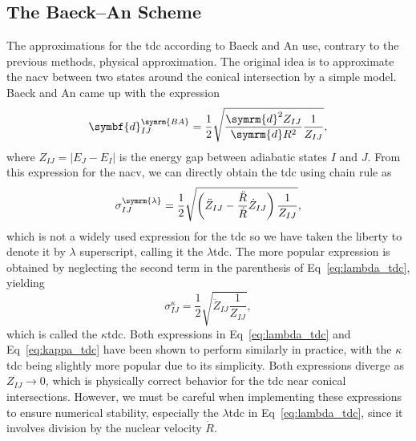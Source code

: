 \subsection{The Baeck--An Scheme}\label{sec:baeck_an}
The approximations for the \acrshort{tdc} according to Baeck and An use, contrary to the previous methods, physical approximation. The original idea is to approximate the \acrshort{nacv} between two states around the conical intersection by a simple model. Baeck and An came up with the expression\supercite{10.1063/1.4975323}
\begin{equation}\label{eq:baeck_an_nacv}
\symbf{d}_{IJ}^{\symrm{BA}}=\frac{1}{2}\sqrt{\frac{\symrm{d}^2Z_{IJ}}{\symrm{d}R^2}\frac{1}{Z_{IJ}}},
\end{equation}
where $Z_{IJ}=\lvert E_J-E_I\rvert$ is the energy gap between adiabatic states $I$ and $J$. From this expression for the \acrshort{nacv}, we can directly obtain the \acrshort{tdc} using chain rule as
\begin{equation}\label{eq:lambda_tdc}
\sigma_{IJ}^{\symrm{\lambda}}=\frac{1}{2}\sqrt{\left(\ddot Z_{IJ}-\frac{\ddot R}{\dot R}\dot Z_{IJ}\right)\frac{1}{Z_{IJ}}},
\end{equation}
which is not a widely used expression for the \acrshort{tdc} so we have taken the liberty to denote it by $\lambda$ superscript, calling it the $\lambda$\acrshort{tdc}.\supercite{10.1021/acs.jctc.5c01176} The more popular expression is obtained by neglecting the second term in the parenthesis of Eq~\eqref{eq:lambda_tdc}, yielding
\begin{equation}\label{eq:kappa_tdc}
\sigma_{IJ}^{\kappa}=\frac{1}{2}\sqrt{\ddot Z_{IJ}\frac{1}{Z_{IJ}}},
\end{equation}
which is called the $\kappa$\acrshort{tdc}.\supercite{10.1021/acs.jctc.1c01080,10.1021/acs.jctc.3c00813,10.12688/openreseurope.13624.2} Both expressions in Eq~\eqref{eq:lambda_tdc} and Eq~\eqref{eq:kappa_tdc} have been shown to perform similarly in practice,\supercite{10.1021/acs.jctc.5c01176} with the $\kappa$\acrshort{tdc} being slightly more popular due to its simplicity. Both expressions diverge as $Z_{IJ}\to 0$, which is physically correct behavior for the \acrshort{tdc} near conical intersections. However, we must be careful when implementing these expressions to ensure numerical stability, especially the $\lambda$\acrshort{tdc} in Eq~\eqref{eq:lambda_tdc}, since it involves division by the nuclear velocity $\dot R$.

